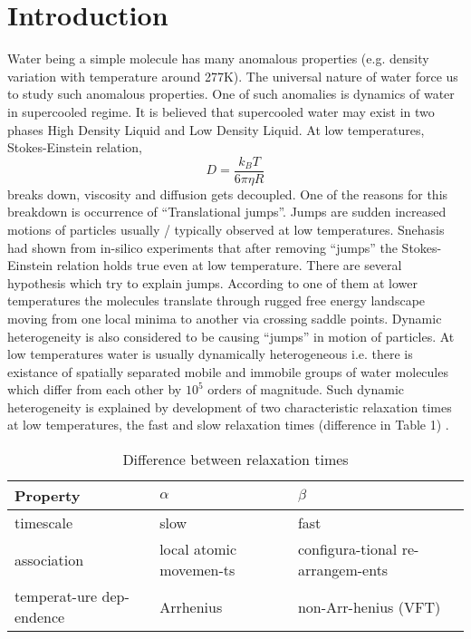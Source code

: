 \documentclass{article}[a4paper,12pt,twoside]
\begin{document}
\section{Introduction}
Water being a simple molecule has many anomalous properties (e.g. density variation with temperature around 277K). The universal nature of water force us to study such 
anomalous properties. One of such anomalies is dynamics of water in supercooled regime. It is believed that supercooled water may exist in two phases High Density Liquid and Low
Density Liquid. At low temperatures, Stokes-Einstein relation, \begin{equation} D=\frac{k_BT}{6\pi\eta R} \end{equation} breaks down, viscosity and diffusion gets decoupled. One of the reasons for this breakdown is occurrence of ``Translational jumps''. 
Jumps are sudden increased motions of particles usually / typically observed at low temperatures. Snehasis had shown from in-silico experiments that after removing ``jumps'' 
the Stokes-Einstein relation holds true even at low temperature. There are several hypothesis which try to explain jumps. According to one of them at lower temperatures the molecules translate through rugged free energy landscape moving from one local minima to another via crossing saddle points. Dynamic heterogeneity is also considered to be causing
``jumps'' in motion of particles. At low temperatures water is usually dynamically heterogeneous i.e. there is existance of spatially separated mobile and immobile groups of 
water molecules which differ from each other by $10^5$ orders of magnitude. Such dynamic heterogeneity is explained by development of two characteristic relaxation times at low
temperatures, the fast and slow relaxation times (difference in Table 1) .
\begin{table}[!hbt]
	\centering
	\caption{Difference between relaxation times}
	\vspace{1.5mm}
	\begin{tabular}{|p{1.5cm}|p{1.5cm}|p{1.5cm}|}
		\hline \textbf{Property}           &   $\alpha$  	    &    $\beta$   \\
		\hline timescale      	           &    slow	    	    &      fast    \\
		\hline association                 &local atomic movemen-ts & configura-tional re-arrangem-ents \\
		\hline temperat-ure dep-endence    & Arrhenius              &  non-Arr-henius (VFT) \\
		\hline
	\end{tabular} 
\end{table}
\end{document}

